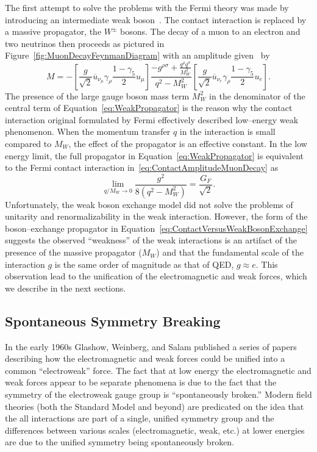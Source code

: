 The first attempt to solve the problems with the Fermi theory was made by
introducing an intermediate weak boson~\cite{Glashow:1961tr}.  The contact
interaction is replaced by a massive propagator, the $W^\pm$ bosons.  The decay
of a muon to an electron and two neutrinos then proceeds as pictured in
Figure~\ref{fig:MuonDecayFeynmanDiagram} with an amplitude
given~\cite{Morii:SMandBSM} by
\begin{equation}
  M = - \left[\frac{g}{\sqrt{2}} \overline u_{\nu_\mu} \gamma_\rho \frac{1 -
  \gamma_5}{2} u_\mu\right] \frac{-g^{\rho\sigma} + \frac{q^\rho
  q^\sigma}{M_W^2}}{q^2 - M_W^2} 
  \left[\frac{g}{\sqrt{2}} \overline u_{\nu_e} \gamma_\rho \frac{1 -
  \gamma_5}{2} u_e\right].
  \label{eq:WeakPropagator}
\end{equation}
The presence of the large gauge boson mass term $M_W^2$ in the denominator of
the central term of Equation~\ref{eq:WeakPropagator} is the reason why the
contact interaction original formulated by Fermi effectively described 
low--energy weak phenomenon.  When the momentum transfer $q$ in the interaction
is small compared to $M_W$, the effect of the propagator is an effective
constant.  In the low energy limit, the full propagator in
Equation~\ref{eq:WeakPropagator} is equivalent to the Fermi contact
interaction in~\ref{eq:ContactAmplitudeMuonDecay} as
\begin{equation}
  \lim_{q/M_W \to 0}\frac{g^2}{8(q^2-M^2_W)} = \frac{G_F}{\sqrt{2}}.
  \label{eq:ContactVersusWeakBosonExchange}
\end{equation}
Unfortunately, the weak boson exchange model did not solve the problems of
unitarity and renormalizability in the weak interaction.   However, the form of
the boson--exchange propagator in
Equation~\ref{eq:ContactVersusWeakBosonExchange} suggests the observed
``weakness'' of the weak interactions is an artifact of the presence of the
massive propagator ($M_W$) and that the fundamental scale of the interaction $g$
is the same order of magnitude as that of QED, $g \approx e$.  This observation
lead to the unification of the electromagnetic and weak forces, which we
describe in the next sections.

\subsection{Spontaneous Symmetry Breaking}
\label{sec:SSB}
In the early 1960s Glashow, Weinberg, and Salam published a series of papers
describing how the electromagnetic and weak forces could be unified into a
common ``electroweak'' force.  The fact that at low energy the electromagnetic
and weak forces appear to be separate phenomena is due to the fact that the
symmetry of the electroweak gauge group is ``spontaneously broken.''  Modern
field theories (both the Standard Model and beyond) are predicated on the idea
that the all interactions are part of a single, unified symmetry group and the 
differences between various scales (electromagnetic, weak, etc.) at lower
energies are due to the unified symmetry being spontaneously broken.

